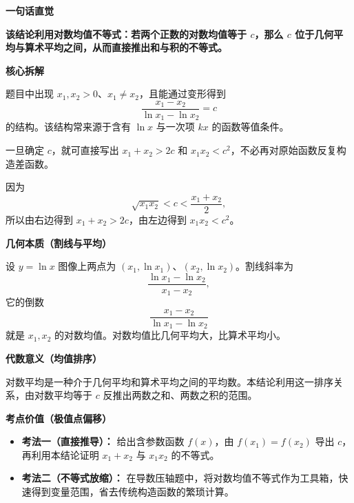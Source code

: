 \begin{explanationbox}
	\textbf{\textcolor{CExplanation}{一句话直觉}}

	\textbf{该结论利用对数均值不等式：若两个正数的对数均值等于 $c$，那么 $c$ 位于几何平均与算术平均之间，从而直接推出和与积的不等式。}

	\medskip
	\textbf{\textcolor{CExplanation}{核心拆解}}
	\begin{description}[style=nextline, leftmargin=2.8em, labelsep=0.5em, itemsep=0.45em]
		\item[\textbf{要点一（条件识别）：}]
		      题目中出现 $x_1,x_2>0$、$x_1\neq x_2$，且能通过变形得到
		      \[
			      \frac{x_1-x_2}{\ln x_1-\ln x_2}=c
		      \]
		      的结构。该结构常来源于含有 $\ln x$ 与一次项 $kx$ 的函数等值条件。

		\item[\textbf{要点二（结论套用）：}]
		      一旦确定 $c$，就可直接写出 $x_1+x_2>2c$ 和 $x_1x_2<c^2$，不必再对原始函数反复构造差函数。

		\item[\textbf{要点三（方向来源）：}]
		      因为
		      \[
			      \sqrt{x_1x_2}<c<\frac{x_1+x_2}{2},
		      \]
		      所以由右边得到 $x_1+x_2>2c$，由左边得到 $x_1x_2<c^2$。
	\end{description}

	\medskip
	\textbf{\textcolor{CExplanation}{几何本质（割线与平均）}}

	设 $y=\ln x$ 图像上两点为 $(x_1,\ln x_1)$、$(x_2,\ln x_2)$。割线斜率为
	\[
		\frac{\ln x_1-\ln x_2}{x_1-x_2},
	\]
	它的倒数
	\[
		\frac{x_1-x_2}{\ln x_1-\ln x_2}
	\]
	就是 $x_1,x_2$ 的对数均值。对数均值比几何平均大，比算术平均小。

	\medskip
	\textbf{\textcolor{CExplanation}{代数意义（均值排序）}}

	对数平均是一种介于几何平均和算术平均之间的平均数。本结论利用这一排序关系，由对数平均等于 $c$ 反推出两数之和、两数之积的范围。

	\medskip
	\textbf{\textcolor{CExplanation}{考点价值（极值点偏移）}}
	\begin{itemize}[leftmargin=*, itemsep=0.5em, topsep=0.4em]
		\item \textbf{考法一（直接推导）：} 给出含参数函数 $f(x)$，由 $f(x_1)=f(x_2)$ 导出 $c$，再利用本结论证明 $x_1+x_2$ 与 $x_1x_2$ 的不等式。
		\item \textbf{考法二（不等式放缩）：} 在导数压轴题中，将对数均值不等式作为工具箱，快速得到变量范围，省去传统构造函数的繁琐计算。
	\end{itemize}


\end{explanationbox}
